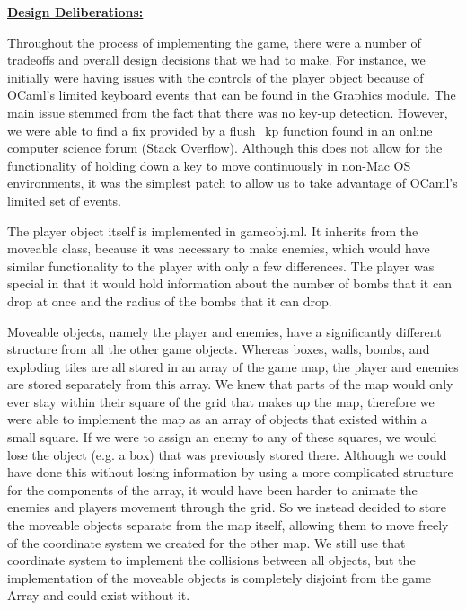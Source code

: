 \documentclass[12pt]{article}
\begin{document}
\vspace{\baselineskip}
\textbf{\uline{Design Deliberations:}}\par

Throughout the process of implementing the game, there were a number of tradeoffs and overall design decisions that we had to make. For instance, we initially were having issues with the controls of the player object because of OCaml’s limited keyboard events that can be found in the Graphics module. The main issue stemmed from the fact that there was no key-up detection. However, we were able to find a fix provided by a flush\_kp function found in an online computer science forum (Stack Overflow). Although this does not allow for the functionality of holding down a key to move continuously in non-Mac OS environments, it was the simplest patch to allow us to take advantage of OCaml’s limited set of events. \par


\vspace{\baselineskip}
The player object itself is implemented in gameobj.ml. It inherits from the moveable class, because it was necessary to make enemies, which would have similar functionality to the player with only a few differences. The player was special in that it would hold information about the number of bombs that it can drop at once and the radius of the bombs that it can drop.\par

Moveable objects, namely the player and enemies, have a significantly different structure from all the other game objects. Whereas boxes, walls, bombs, and exploding tiles are all stored in an array of the game map, the player and enemies are stored separately from this array. We knew that parts of the map would only ever stay within their square of the grid that makes up the map, therefore we were able to implement the map as an array of objects that existed within a small square. If we were to assign an enemy to any of these squares, we would lose the object (e.g. a box) that was previously stored there. Although we could have done this without losing information by using a more complicated structure for the components of the array, it would have been harder to animate the enemies and players movement through the grid. So we instead decided to store the moveable objects separate from the map itself, allowing them to move freely of the coordinate system we created for the other map. We still use that coordinate system to implement the collisions between all objects, but the implementation of the moveable objects is completely disjoint from the game Array and could exist without it.\par
\end{document}
